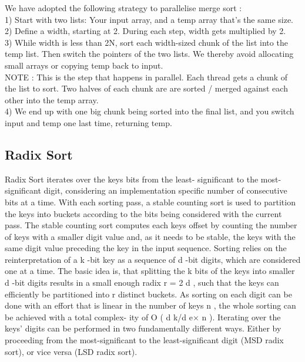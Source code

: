 \documentclass[journal]{IEEEtran}
\begin{document}
We have adopted the following strategy to parallelise merge sort :\\
1) Start with two lists: Your input array, and a temp array that’s the same size.\\
2) Define a width, starting at 2. During each step, width gets multiplied by 2.\\
3) While width is less than 2N, sort each width-sized chunk of the list into the temp list. Then switch the pointers of the two lists. We thereby avoid allocating small arrays or copying temp back to input.\\

NOTE : This is the step that happens in parallel. Each thread gets a
chunk of the list to sort.
Two halves of each chunk are are sorted / merged against
each other into the temp array.\\

4) We end up with one big chunk being sorted into the final list, and you switch input and temp one last time, returning temp.

\subsection{Radix Sort}
Radix Sort iterates over the keys bits from the least-
significant to the most-significant digit, considering an
implementation specific number of consecutive bits at a time.
With each sorting pass, a stable counting sort is used to partition the keys into buckets according to the bits being
considered with the current pass. The stable counting sort
computes each keys offset by counting the number of keys
with a smaller digit value and, as it needs to be stable,
the keys with the same digit value preceding the key in
the input sequence.
Sorting relies on the reinterpretation of a
k
-bit key
as a sequence of
d
-bit digits, which are considered one at
a time. The basic idea is, that splitting the
k
bits of the
keys into smaller
d
-bit digits results in a small enough radix
r
= 2
d
, such that the keys can efficiently be partitioned
into
r
distinct buckets. As sorting on each digit can be
done with an effort that is linear in the number of keys
n
,
the whole sorting can be achieved with a total complex-
ity of
O
(
d
k/d
e×
n
). Iterating over the keys’ digits can be
performed in two fundamentally different ways. Either by
proceeding from the most-significant to the least-significant
digit (MSD radix sort), or vice versa (LSD radix sort).
\end{document}
